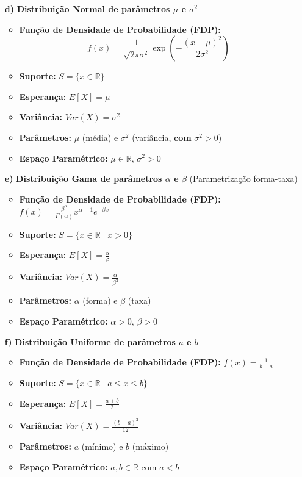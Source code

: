 \documentclass[12pt, a4paper]{article}
\begin{document}
\begin{enumerate}
    \item[\textbf{d)}] \textbf{Distribuição Normal de parâmetros $\mu$ e $\sigma^2$}
        \begin{itemize}
            \item \textbf{Função de Densidade de Probabilidade (FDP):}
            \[
                f(x) = \frac{1}{\sqrt{2\pi\sigma^2}} \exp\left(-\frac{(x-\mu)^2}{2\sigma^2}\right)
            \]
            \item \textbf{Suporte:} $S = \{x \in \mathbb{R}\}$
            \item \textbf{Esperança:} $E[X] = \mu$
            \item \textbf{Variância:} $Var(X) = \sigma^2$
            \item \textbf{Parâmetros:} $\mu$ (média) e $\sigma^2$ (variância, \textbf{com} $\sigma^2 > 0$)
            \item \textbf{Espaço Paramétrico:} $\mu \in \mathbb{R}$, $\sigma^2 > 0$
        \end{itemize}

    \item[\textbf{e)}] \textbf{Distribuição Gama de parâmetros $\alpha$ e $\beta$}
        (Parametrização forma-taxa)
        \begin{itemize}
            \item \textbf{Função de Densidade de Probabilidade (FDP):} $f(x) = \frac{\beta^\alpha}{\Gamma(\alpha)} x^{\alpha-1} e^{-\beta x}$
            \item \textbf{Suporte:} $S = \{x \in \mathbb{R} \mid x > 0\}$
            \item \textbf{Esperança:} $E[X] = \frac{\alpha}{\beta}$
            \item \textbf{Variância:} $Var(X) = \frac{\alpha}{\beta^2}$
            \item \textbf{Parâmetros:} $\alpha$ (forma) e $\beta$ (taxa)
            \item \textbf{Espaço Paramétrico:} $\alpha > 0$, $\beta > 0$
        \end{itemize}

    \item[\textbf{f)}] \textbf{Distribuição Uniforme de parâmetros $a$ e $b$}
        \begin{itemize}
            \item \textbf{Função de Densidade de Probabilidade (FDP):} $f(x) = \frac{1}{b-a}$
            \item \textbf{Suporte:} $S = \{x \in \mathbb{R} \mid a \le x \le b\}$
            \item \textbf{Esperança:} $E[X] = \frac{a+b}{2}$
            \item \textbf{Variância:} $Var(X) = \frac{(b-a)^2}{12}$
            \item \textbf{Parâmetros:} $a$ (mínimo) e $b$ (máximo)
            \item \textbf{Espaço Paramétrico:} $a, b \in \mathbb{R}$ com $a < b$
        \end{itemize}
\end{enumerate}
\end{document}
